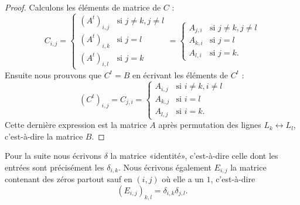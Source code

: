 \begin{proof}
	Calculons les éléments de matrice de \( C\) :
	\begin{equation}
		C_{i,j}=\begin{cases}
			(A^t)_{i,j} & \text{si }  j\neq k, j\neq l \\
			(A^t)_{i,k} & \text{si }  j=l              \\
			(A^t)_{i,l} & \text{si }  j=k
		\end{cases}=
		\begin{cases}
			A_{j,i} & \text{si }  j\neq k, j\neq l \\
			A_{k,i} & \text{si }  j=l              \\
			A_{l,i} & \text{si }  j=k.
		\end{cases}
	\end{equation}
	Ensuite nous prouvons que \( C^t=B\) en écrivant les éléments de \( C^t\) :
	\begin{equation}
		(C^t)_{i,j}=C_{j,i}=\begin{cases}
			A_{i,j} & \text{si } i\neq k, i\neq l \\
			A_{k,j} & \text{si } i=l              \\
			A_{l,j} & \text{si } i=k.
		\end{cases}
	\end{equation}
	Cette dernière expression est la matrice \( A\) après permutation des lignes \( L_k\leftrightarrow L_l\), c'est-à-dire la matrice \( B\).
\end{proof}

Pour la suite nous écrivons \( \delta\) la matrice «identité», c'est-à-dire celle dont les entrées sont précisément les \( \delta_{i,k}\).  Nous écrivons également \( E_{i,j}\) la matrice contenant des zéros partout sauf en \( (i,j)\) où elle a un \( 1\), c'est-à-dire
\begin{equation}
	(E_{i,j})_{k,l}=\delta_{i,k}\delta_{j,l}.
\end{equation}

